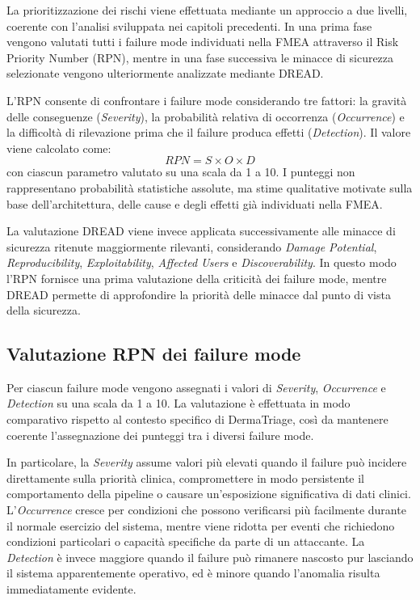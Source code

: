 La prioritizzazione dei rischi viene effettuata mediante un approccio a due livelli, coerente con l'analisi sviluppata nei capitoli precedenti. In una prima fase vengono valutati tutti i failure mode individuati nella FMEA attraverso il Risk Priority Number (RPN), mentre in una fase successiva le minacce di sicurezza selezionate vengono ulteriormente analizzate mediante DREAD.

L'RPN consente di confrontare i failure mode considerando tre fattori: la gravità delle conseguenze (\textit{Severity}), la probabilità relativa di occorrenza (\textit{Occurrence}) e la difficoltà di rilevazione prima che il failure produca effetti (\textit{Detection}). Il valore viene calcolato come:
\[
RPN = S \times O \times D
\]
con ciascun parametro valutato su una scala da 1 a 10. I punteggi non rappresentano probabilità statistiche assolute, ma stime qualitative motivate sulla base dell'architettura, delle cause e degli effetti già individuati nella FMEA.

La valutazione DREAD viene invece applicata successivamente alle minacce di sicurezza ritenute maggiormente rilevanti, considerando \textit{Damage Potential}, \textit{Reproducibility}, \textit{Exploitability}, \textit{Affected Users} e \textit{Discoverability}. In questo modo l'RPN fornisce una prima valutazione della criticità dei failure mode, mentre DREAD permette di approfondire la priorità delle minacce dal punto di vista della sicurezza.


\subsection{Valutazione RPN dei failure mode}
Per ciascun failure mode vengono assegnati i valori di \textit{Severity}, \textit{Occurrence} e \textit{Detection} su una scala da 1 a 10. La valutazione è effettuata in modo comparativo rispetto al contesto specifico di DermaTriage, così da mantenere coerente l'assegnazione dei punteggi tra i diversi failure mode.

In particolare, la \textit{Severity} assume valori più elevati quando il failure può incidere direttamente sulla priorità clinica, compromettere in modo persistente il comportamento della pipeline o causare un'esposizione significativa di dati clinici. L'\textit{Occurrence} cresce per condizioni che possono verificarsi più facilmente durante il normale esercizio del sistema, mentre viene ridotta per
eventi che richiedono condizioni particolari o capacità specifiche da parte di un attaccante. La \textit{Detection} è invece maggiore quando il failure può rimanere nascosto pur lasciando il sistema apparentemente operativo, ed è minore quando l'anomalia risulta immediatamente evidente.

